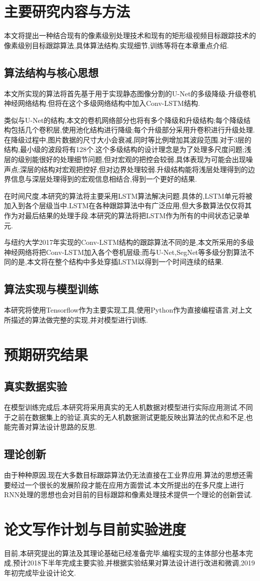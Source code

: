 \chapter{主要研究内容与方法}
本文将提出一种结合现有的像素级别处理技术和现有的矩形级视频目标跟踪技术的像素级别目标跟踪算法,具体算法结构,实现细节,训练等将在本章重点介绍.
\section{算法结构与核心思想}
本文所实现的算法将首先基于用于实现静态图像分割的U-Net\supercite{ronneberger2015u}的多级降级-升级卷机神经网络结构.但将在这个多级网络结构中加入Conv-LSTM结构.
\par
类似与U-Net的结构,本文的卷机网络部分也将有多个降级和升级结构;每个降级结构包括几个卷积层,使用池化结构进行降级;每个升级部分采用升卷积进行升级处理.在降级过程中,图片数据的尺寸大小会衰减,同时等比例增加其波段范围.对于3层的结构,最小级的波段将有128个.这个多级结构的设计理念是为了处理多尺度问题;浅层的级别能很好的处理细节问题,但对宏观的把控会较弱,具体表现为可能会出现噪声点;深层的结构对宏观把控好,但对边界处理较弱.升级结构能将浅层处理得到的边界信息与深层处理得到的宏观信息相结合,得到一个更好的结果.
\par
在时间尺度,本研究的算法将主要采用LSTM算法解决问题.具体的,LSTM单元将被加入到各个层级当中.LSTM在各种跟踪算法中有广泛应用,但大多数算法仅仅将其作为对最后结果的处理手段.本研究的算法将把LSTM作为所有的中间状态记录单元.
\par
与纽约大学2017年实现的Conv-LSTM结构的跟踪算法不同的是,本文所采用的多级神经网络将把Conv-LSTM加入各个卷机层级;而与U-Net,SegNet等多级分割算法不同的是,本文将在整个结构中多处穿插LSTM以得到一个时间连续的结果.
\section{算法实现与模型训练}
本研究将使用Tensorflow作为主要实现工具,使用Python作为直接编程语言,对上文所描述的算法做完整的实现,并对模型进行训练.

\chapter{预期研究结果}
\section{真实数据实验}
在模型训练完成后,本研究将采用真实的无人机数据对模型进行实际应用测试.不同于之前在数据集上的验证,真实的无人机数据测试更能反映出算法的优点和不足,也能完善对算法设计思路的反思.
\section{理论创新}
由于种种原因,现在大多数目标跟踪算法仍无法直接在工业界应用.算法的思想还需要经过一个很长的发展阶段才能在应用方面尝试.本文所提出的在多尺度上进行RNN处理的思想也会对目前的目标跟踪和像素处理技术提供一个理论的创新尝试.

\chapter{论文写作计划与目前实验进度}
目前,本研究提出的算法及其理论基础已经准备完毕,编程实现的主体部分也基本完成,预计2018下半年完成主要实验,并根据实验结果对算法设计进行改进和微调,2019年初完成毕业设计论文.
